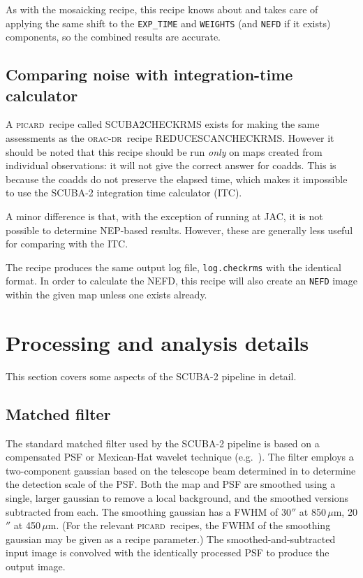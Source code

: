 \documentclass[twoside,11pt]{article}
\newcommand{\xlabel}[1]{}
\renewcommand{\_}{\texttt{\symbol{95}}}
\newcommand{\oracdr}{\textsc{orac-dr}}
\newcommand{\picard}{\textsc{picard}}
\newcommand{\task}[1]{\textsf{#1}}
\begin{document}
As with the mosaicking recipe, this recipe knows about and takes care
of applying the same shift to the \verb+EXP_TIME+ and \verb+WEIGHTS+
(and \verb+NEFD+ if it exists) components, so the combined results are
accurate.

\subsection{Comparing noise with integration-time calculator\label{se:checkrms}}

A \picard\ recipe called \task{SCUBA2\_CHECK\_RMS} exists for making
the same assessments as the \oracdr\ recipe
\task{REDUCE\_SCAN\_CHECKRMS}. However it should be noted that this
recipe should be run \textit{only} on maps created from individual
observations: it will not give the correct answer for coadds. This is
because the coadds do not preserve the elapsed time, which makes it
impossible to use the SCUBA-2 integration time calculator (ITC).

A minor difference is that, with the exception of running at JAC, it
is not possible to determine NEP-based results. However, these are
generally less useful for comparing with the ITC.

The recipe produces the same output log file, \texttt{log.checkrms}
with the identical format. In order to calculate the NEFD, this recipe
will also create an \verb+NEFD+ image within the given map unless one
exists already.


\section{\xlabel{procdetails}Processing and analysis details\label{procdetails}}

This section covers some aspects of the SCUBA-2 pipeline in detail.

\subsection{Matched filter}

The standard matched filter used by the SCUBA-2 pipeline is based on a
compensated PSF or Mexican-Hat wavelet technique
(e.g.\ \cite{mhwpaper}). The filter employs a two-component gaussian
based on the telescope beam determined in \cite{scuba2calpaper} to
determine the detection scale of the PSF. Both the map and PSF are
smoothed using a single, larger gaussian to remove a local background,
and the smoothed versions subtracted from each. The smoothing gaussian
has a FWHM of 30$''$ at 850\,$\mu$m, 20$''$ at 450\,$\mu$m. (For the
relevant \picard\ recipes, the FWHM of the smoothing gaussian may be
given as a recipe parameter.) The smoothed-and-subtracted input image
is convolved with the identically processed PSF to produce the output
image.
\end{document}

